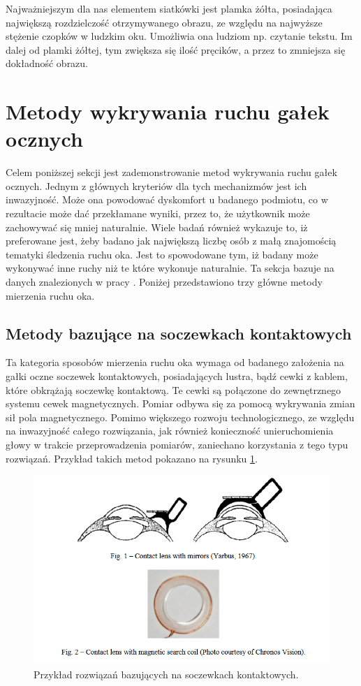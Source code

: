 Najważniejszym dla nas elementem siatkówki jest plamka żółta, posiadająca największą rozdzielczość otrzymywanego obrazu, ze względu na najwyższe stężenie czopków w ludzkim oku. Umożliwia ona ludziom np. czytanie tekstu. Im dalej od plamki żółtej, tym zwiększa się ilość pręcików, a przez to zmniejsza się dokładność obrazu.
\section{Metody wykrywania ruchu gałek ocznych}
\label{sec:movement}
Celem poniższej sekcji jest zademonstrowanie metod wykrywania ruchu gałek ocznych. Jednym z głównych kryteriów dla tych mechanizmów jest ich inwazyjność. Może ona powodować dyskomfort u badanego podmiotu, co w rezultacie może dać przekłamane wyniki, przez to, że użytkownik może zachowywać się mniej naturalnie. Wiele badań również wykazuje to, iż preferowane jest, żeby badano jak największą liczbę osób z małą znajomością tematyki śledzenia ruchu oka. Jest to spowodowane tym, iż badany może wykonywać inne ruchy niż te które wykonuje naturalnie. Ta sekcja bazuje na danych znalezionych w pracy \cite{metodyeyetrack}. Poniżej przedstawiono trzy główne metody mierzenia ruchu oka.\par
\subsection{Metody bazujące na soczewkach kontaktowych}
\label{ssec:lenses}
Ta kategoria sposobów mierzenia ruchu oka wymaga od badanego założenia na gałki oczne soczewek kontaktowych, posiadających lustra, bądź cewki z kablem, które obkrążają soczewkę kontaktową. Te cewki są połączone do zewnętrznego systemu cewek magnetycznych. Pomiar odbywa się za pomocą wykrywania zmian sił pola magnetycznego. Pomimo większego rozwoju technologicznego, ze względu na inwazyjność całego rozwiązania, jak również konieczność unieruchomienia głowy w trakcie przeprowadzenia pomiarów, zaniechano korzystania z tego typu rozwiązań. Przykład takich metod pokazano na rysunku \ref{fig:soczewki}.
\begin{figure}[H]
    \centering
    \captionsetup{justification=centering,margin=2cm}
    \includegraphics[width=0.9\linewidth]{resources/soczewki.png}
    \caption{Przykład rozwiązań bazujących na soczewkach kontaktowych.}
    \label{fig:soczewki}
\end{figure}
